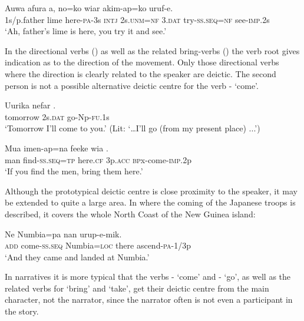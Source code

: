 \ea%
\label{ex:x1275}
\gll Auwa  afura    a,  no=ko  wiar akim-ap=ko  uruf-e.\\
1s/p.father  lime  here-\textsc{pa}-3s  \textsc{intj}  2s.\textsc{unm}=\textsc{nf}  3.\textsc{dat} try-\textsc{ss}.\textsc{seq}=\textsc{nf}  see-\textsc{imp}.2s\\
\glt `Ah, father's lime is here, you try it and see.'
\z

In the directional verbs () as well as the related bring-verbs () the verb root gives indication as to the direction of the movement. Only those directional verbs where the direction is clearly related to the speaker are deictic. The second person is not a possible alternative deictic centre for the verb - `come'.  

\ea%
\label{ex:x1278}
\gll Uurika  nefar  . \\
tomorrow  2s.\textsc{dat}  go-Np-\textsc{fu}.1s \\
\glt `Tomorrow I'll come to you.' (Lit: `{\dots}I'll go (from my present place) ...')
\z

\ea%
\label{ex:x1279}
\gll Mua  imen-ap=na  feeke  wia  . \\
man  find-\textsc{ss}.\textsc{seq}=\textsc{tp}  here.\textsc{cf}  3p.\textsc{acc}  \textsc{bp}x-come-\textsc{imp}.2p\\
\glt `If you find the men, bring them here.'
\z
{}

Although the prototypical deictic centre is close proximity to the speaker, it may be extended to quite a large area. In  where the coming of the Japanese troops is described, it covers the whole North Coast of the New Guinea island: 

\ea%
\label{ex:x1892}
\gll Ne    Numbia=pa  nan  urup-e-mik. \\
\textsc{add}  come-\textsc{ss}.\textsc{seq}  Numbia=\textsc{loc}  there  ascend-\textsc{pa}-1/3p\\
\glt `And they came and landed at Numbia.'
\z

In narratives it is more typical that the verbs - `come' and - `go', as well as the related verbs for `bring' and `take', get their deictic centre from the main character, not the narrator, since the narrator often is not even a participant in the story. 

